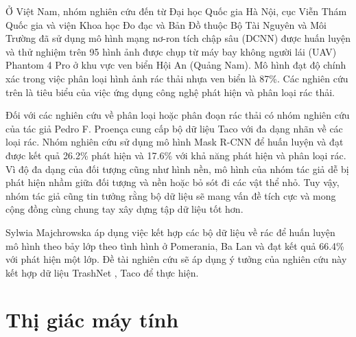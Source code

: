 \documentclass[../the.tex]{subfiles}
\begin{document}
\bigskip

{\fontsize{13}{12} \selectfont

	Ở Việt Nam, nhóm nghiên cứu đến từ Đại học Quốc gia Hà Nội, cục Viễn
	Thám Quốc gia và viện Khoa học Đo đạc và Bản Đồ thuộc Bộ Tài Nguyên và
	Môi Trường \cite{nhung2021nghien} đã sử dụng mô hình mạng nơ-ron tích chập sâu (DCNN) được
	huấn luyện và thử nghiệm trên 95 hình ảnh được chụp từ máy bay không người
	lái (UAV) Phantom 4 Pro ở khu vực ven biển Hội An (Quảng Nam). Mô hình
	đạt độ chính xác trong việc phân loại hình ảnh rác thải nhựa ven biển là 87\%.
	Các nghiên cứu trên là tiêu biểu của việc ứng dụng công nghệ phát hiện
	và phân loại rác thải.
}
\bigskip

{\fontsize{13}{12} \selectfont

	Đối với các nghiên cứu về phân loại hoặc phân đoạn rác thải có nhóm nghiên cứu của tác giả Pedro F. Proença \cite{proença2020taco} cung cấp bộ dữ liệu Taco với đa dạng nhãn về các loại rác.
	Nhóm nghiên cứu sử dụng mô hình Mask R-CNN để huấn luyện và đạt được kết quả 26.2\% phát hiện và 17.6\% với khả năng phát hiện và phân loại rác.
	Vì độ đa dạng của đối tượng cũng như hình nền, mô hình của nhóm tác giả dễ bị phát hiện nhầm giữa đối tượng và nền hoặc bỏ sót đi các vật thể nhỏ. Tuy vậy, nhóm tác giả cũng tin tưởng rằng bộ dữ liệu sẽ mang vấn đề tích cực và mong cộng đồng cùng chung tay xây dựng tập dữ liệu tốt hơn.
}
\bigskip

{\fontsize{13}{12} \selectfont

	Sylwia Majchrowska \cite{Majchrowska_2022} áp dụng việc kết hợp các bộ dữ liệu về rác để huấn luyện mô hình theo bảy lớp theo tình hình ở Pomerania, Ba Lan và đạt kết quả 66.4\% với phát hiện một lớp.
	Đề tài nghiên cứu sẽ áp dụng ý tưởng của nghiên cứu này \cite{Majchrowska_2022} kết hợp dữ liệu TrashNet \cite{yang2016classification}, Taco \cite{proença2020taco} để thực hiện.
}
\section{Thị giác máy tính}
\label{sec:ttmt}
\end{document}
